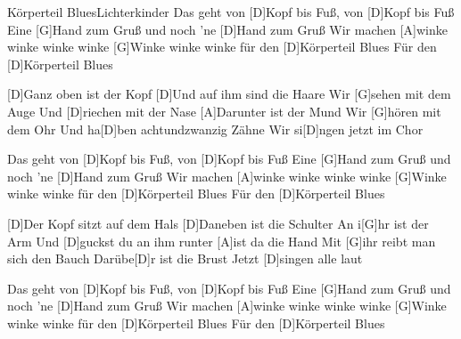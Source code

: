 \documentclass[../main.tex]{subfiles}
\begin{document}
\begin{song}{Körperteil Blues}{Lichterkinder}{}
Das geht von [D]Kopf bis Fuß, von [D]Kopf bis Fuß
Eine [G]Hand zum Gruß und noch 'ne [D]Hand zum Gruß
Wir machen [A]winke winke winke winke
[G]Winke winke winke für den [D]Körperteil Blues
Für den [D]Körperteil Blues

[D]Ganz oben ist der Kopf
[D]Und auf ihm sind die Haare
Wir [G]sehen mit dem Auge
Und [D]riechen mit der Nase
[A]Darunter ist der Mund
Wir [G]hören mit dem Ohr
Und ha[D]ben achtundzwanzig Zähne
Wir si[D]ngen jetzt im Chor

Das geht von [D]Kopf bis Fuß, von [D]Kopf bis Fuß
Eine [G]Hand zum Gruß und noch 'ne [D]Hand zum Gruß
Wir machen [A]winke winke winke winke
[G]Winke winke winke für den [D]Körperteil Blues
Für den [D]Körperteil Blues

[D]Der Kopf sitzt auf dem Hals
[D]Daneben ist die Schulter
An i[G]hr ist der Arm
Und [D]guckst du an ihm runter
[A]ist da die Hand
Mit [G]ihr reibt man sich den Bauch
Darübe[D]r ist die Brust
Jetzt [D]singen alle laut

Das geht von [D]Kopf bis Fuß, von [D]Kopf bis Fuß
Eine [G]Hand zum Gruß und noch 'ne [D]Hand zum Gruß
Wir machen [A]winke winke winke winke
[G]Winke winke winke für den [D]Körperteil Blues
Für den [D]Körperteil Blues
\end{song}
\end{document}
